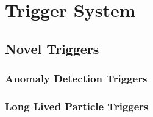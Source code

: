 \section{Trigger System}


\subsection{Novel Triggers}

\subsubsection{Anomaly Detection Triggers}


\subsubsection{Long Lived Particle Triggers}
